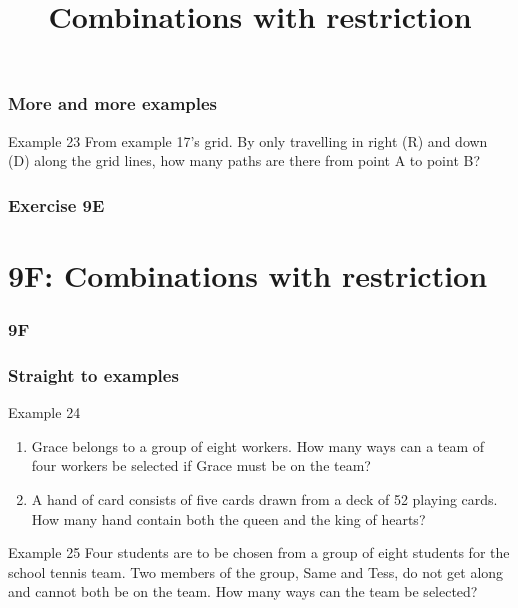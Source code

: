 \documentclass[
	11pt, %
]{beamer}
\begin{document}
\begin{frame}[t]
    \frametitle{More and more examples}
    \begin{block}{Example 23}
        From example 17's grid. By only travelling in right (R) and down (D) along the grid lines, how many paths are 
        there from point A to point B?
    \end{block}
\end{frame}

\begin{frame}
    \frametitle{Exercise 9E}
\end{frame}


\section{9F: Combinations with restriction}
\begin{frame}
    \frametitle{9F}
    \begin{center}
        \title{Combinations with restriction}
        \maketitle
    \end{center}
\end{frame}

\begin{frame}[t]
    \frametitle{Straight to examples}
    \begin{block}{Example 24}
        \begin{enumerate}
            \item Grace belongs to a group of eight workers. How many ways can a team of four workers be selected if Grace 
            must be on the team?
            \item A hand of card consists of five cards drawn from a deck of 52 playing cards. How many hand contain both 
            the queen and the king of hearts?
        \end{enumerate}
    \end{block}
    \begin{block}{Example 25}
        Four students are to be chosen from a group of eight students for the school tennis team. Two members of the group, Same 
        and Tess, do not get along and cannot both be on the team. How many ways can the team be selected?
    \end{block}
\end{frame}
\end{document}
